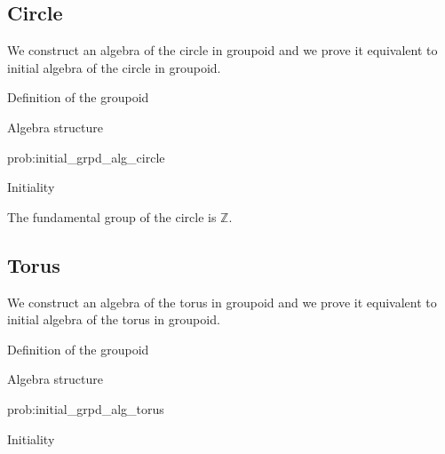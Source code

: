 \subsection{Circle}
\label{sec:circle_fund_group}

We construct an algebra of the circle in groupoid and we prove it
equivalent to initial algebra of the circle in groupoid.

\begin{definition}
  Definition of the groupoid
\end{definition}

\begin{problem}
  \label{prob:initial_grpd_alg_circle}
  Algebra structure
\end{problem}

\begin{construction}{prob:initial_grpd_alg_circle}

\end{construction}

\begin{proposition}
  Initiality
\end{proposition}

\begin{corollary}
  The fundamental group of the circle is $\mathbb{Z}$.
\end{corollary}

\subsection{Torus}
\label{sec:torus_fund_group}

We construct an algebra of the torus in groupoid and we prove it
equivalent to initial algebra of the torus in groupoid.

\begin{definition}
  Definition of the groupoid
\end{definition}

\begin{problem}
  \label{prob:initial_grpd_alg_torus}
  Algebra structure
\end{problem}

\begin{construction}{prob:initial_grpd_alg_torus}

\end{construction}

\begin{proposition}
  Initiality
\end{proposition}

